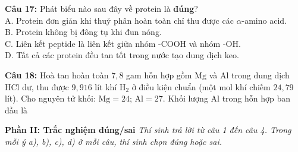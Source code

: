 \documentclass[12pt,a4paper]{article}
\begin{document}
\noindent \textbf{Câu 17:} Phát biểu nào sau đây về protein là \textbf{đúng}?\\
\noindent A. Protein đơn giản khi thuỷ phân hoàn toàn chỉ thu được các $\alpha$-amino acid.\\
\noindent B. Protein không bị đông tụ khi đun nóng.\\
\noindent C. Liên kết peptide là liên kết giữa nhóm $\text{-COOH}$ và nhóm $\text{-OH}$.\\
\noindent D. Tất cả các protein đều tan tốt trong nước tạo dung dịch keo.

\noindent \textbf{Câu 18:} Hoà tan hoàn toàn $7{,}8$ gam hỗn hợp gồm $\text{Mg}$ và $\text{Al}$ trong dung dịch $\text{HCl}$ dư, thu được $9{,}916$ lít khí $\text{H}_2$ ở điều kiện chuẩn (một mol khí chiếm $24{,}79$ lít). Cho nguyên tử khối: $\text{Mg} = 24$; $\text{Al} = 27$. Khối lượng $\text{Al}$ trong hỗn hợp ban đầu là\\
\noindent{}

\vspace{0.5cm}
\textbf{Phần II: Trắc nghiệm đúng/sai} \textit{Thí sinh trả lời từ câu 1 đến câu 4. Trong mỗi ý a), b), c), d) ở mỗi câu, thí sinh chọn đúng hoặc sai.}
\end{document}
